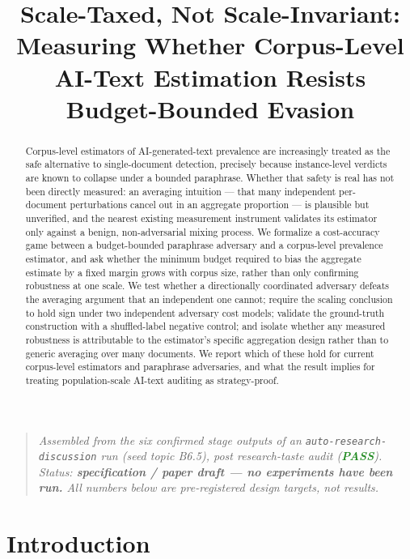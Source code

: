 \documentclass[11pt]{article}
\title{\textbf{Scale-Taxed, Not Scale-Invariant:\\ Measuring Whether Corpus-Level AI-Text Estimation Resists Budget-Bounded Evasion}}
\author{}
\date{}
\begin{document}
\maketitle
\vspace{-2em}

\begin{quote}
\small\textit{Assembled from the six confirmed stage outputs of an \texttt{auto-research-discussion} run (seed topic B6.5), post research-taste audit (\textcolor{ForestGreen}{\textbf{PASS}}). Status: \textbf{specification / paper draft --- no experiments have been run.} All numbers below are pre-registered design targets, not results.}
\end{quote}

\begin{abstract}
Corpus-level estimators of AI-generated-text prevalence are increasingly treated as the safe alternative to single-document detection, precisely because instance-level verdicts are known to collapse under a bounded paraphrase. Whether that safety is real has not been directly measured: an averaging intuition --- that many independent per-document perturbations cancel out in an aggregate proportion --- is plausible but unverified, and the nearest existing measurement instrument validates its estimator only against a benign, non-adversarial mixing process. We formalize a cost-accuracy game between a budget-bounded paraphrase adversary and a corpus-level prevalence estimator, and ask whether the minimum budget required to bias the aggregate estimate by a fixed margin grows with corpus size, rather than only confirming robustness at one scale. We test whether a directionally coordinated adversary defeats the averaging argument that an independent one cannot; require the scaling conclusion to hold sign under two independent adversary cost models; validate the ground-truth construction with a shuffled-label negative control; and isolate whether any measured robustness is attributable to the estimator's specific aggregation design rather than to generic averaging over many documents. We report which of these hold for current corpus-level estimators and paraphrase adversaries, and what the result implies for treating population-scale AI-text auditing as strategy-proof.
\end{abstract}

\section{Introduction}
\end{document}

